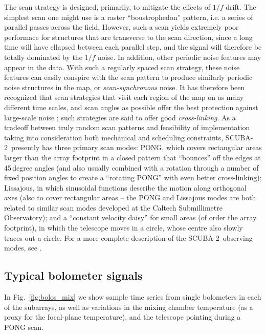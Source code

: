 \documentclass[useAMS,usenatbib,nofootinbib]{mn2e}
\newcommand{\scuba}{SCUBA-2}
\begin{document}
The scan strategy is designed, primarily, to mitigate the effects of
$1/f$ drift. The simplest scan one might use is a raster
``boustrophedon'' pattern, i.e. a series of parallel passes across the
field. However, such a scan yields extremely poor performace for
structures that are transverse to the scan direction, since a long
time will have ellapsed between each parallel step, and the signal
will therefore be totally dominated by the $1/f$ noise. In addition,
other periodic noise features may appear in the data. With such a
regularly spaced scan strategy, these noise features can easily
conspire with the scan pattern to produce similarly periodic noise
structures in the map, or \emph{scan-synchronous} noise. It has
therefore been recognized that scan strategies that visit each region
of the map on as many different time scales, and scan angles as
possible offer the best protection against large-scale noise
\citep[see discussion in][and references therein]{kovacs2008b}; such
strategies are said to offer good \emph{cross-linking}. As a tradeoff
between truly random scan patterns and feasibility of implementation
taking into consideration both mechanical and scheduling constraints,
\scuba\ presently has three primary scan modes: PONG, which covers
rectangular areas larger than the array footprint in a closed pattern
that ``bounces'' off the edges at 45\,degree angles (and also usually
combined with a rotation through a number of fixed position angles to
create a ``rotating PONG'' with even better cross-linking); Lissajous,
in which sinusoidal functions describe the motion along orthogonal
axes (also to cover rectangular areas -- the PONG and Lissajous modes
are both related to similar scan modes developed at the Caltech
Submillimetre Observatory); and a ``constant velocity daisy'' for
small areas (of order the array footprint), in which the telescope
moves in a circle, whose centre also slowly traces out a circle. For a
more complete description of the \scuba\ observing modes, see
\citet{holland2012}.

\subsection{Typical bolometer signals}
\label{sec:bolosignal}

In Fig.~\ref{fig:bolos_mix} we show sample time series from single
bolometers in each of the subarrays, as well as variations in the
mixing chamber temperature (as a proxy for the focal-plane
temperature), and the telescope pointing during a PONG scan.
\end{document}
